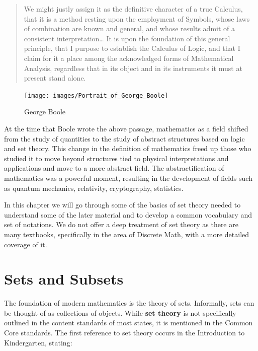 \documentclass[
]{book}
\theoremstyle{definition}
\theoremstyle{definition}
\theoremstyle{definition}
\theoremstyle{definition}
\theoremstyle{remark}
\begin{document}
\begin{quote}
We might justly assign it as the definitive character of a true Calculus, that it is a method resting upon the employment of Symbols, whose laws of combination are known and general, and whose results admit of a consistent interpretation\ldots{} It is upon the foundation of this general principle, that I purpose to establish the Calculus of Logic, and that I claim for it a place among the acknowledged forms of Mathematical Analysis, regardless that in its object and in its instruments it must at present stand alone.
\end{quote}

\begin{figure}

{\centering \texttt{[image: images/Portrait\_of\_George\_Boole]} 

}

\caption{George Boole}\label{fig:unnamed-chunk-4}
\end{figure}

At the time that Boole wrote the above passage, mathematics as a field shifted from the study of quantities to the study of abstract structures based on logic and set theory. This change in the definition of mathematics freed up those who studied it to move beyond structures tied to physical interpretations and applications and move to a more abstract field. The abstractification of mathematics was a powerful moment, resulting in the development of fields such as quantum mechanics, relativity, cryptography, statistics.

In this chapter we will go through some of the basics of set theory needed to understand some of the later material and to develop a common vocabulary and set of notations. We do not offer a deep treatment of set theory as there are many textbooks, specifically in the area of Discrete Math, with a more detailed coverage of it.

\hypertarget{sets-and-subsets}{%
\section{Sets and Subsets}\label{sets-and-subsets}}

The foundation of modern mathematics is the theory of sets. Informally, sets can be thought of as collections of objects. While \textbf{set theory} is not specifically outlined in the content standards of most states, it is mentioned in the Common Core standards. The first reference to set theory occurs in the Introduction to Kindergarten, stating:
\end{document}
